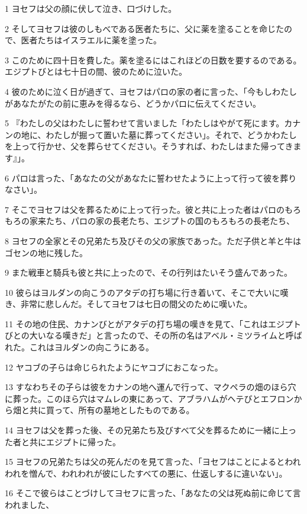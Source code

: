 \par 1 ヨセフは父の顔に伏して泣き、口づけした。
\par 2 そしてヨセフは彼のしもべである医者たちに、父に薬を塗ることを命じたので、医者たちはイスラエルに薬を塗った。
\par 3 このために四十日を費した。薬を塗るにはこれほどの日数を要するのである。エジプトびとは七十日の間、彼のために泣いた。
\par 4 彼のために泣く日が過ぎて、ヨセフはパロの家の者に言った、「今もしわたしがあなたがたの前に恵みを得るなら、どうかパロに伝えてください。
\par 5 『わたしの父はわたしに誓わせて言いました「わたしはやがて死にます。カナンの地に、わたしが掘って置いた墓に葬ってください」。それで、どうかわたしを上って行かせ、父を葬らせてください。そうすれば、わたしはまた帰ってきます』」。
\par 6 パロは言った、「あなたの父があなたに誓わせたように上って行って彼を葬りなさい」。
\par 7 そこでヨセフは父を葬るために上って行った。彼と共に上った者はパロのもろもろの家来たち、パロの家の長老たち、エジプトの国のもろもろの長老たち、
\par 8 ヨセフの全家とその兄弟たち及びその父の家族であった。ただ子供と羊と牛はゴセンの地に残した。
\par 9 また戦車と騎兵も彼と共に上ったので、その行列はたいそう盛んであった。
\par 10 彼らはヨルダンの向こうのアタデの打ち場に行き着いて、そこで大いに嘆き、非常に悲しんだ。そしてヨセフは七日の間父のために嘆いた。
\par 11 その地の住民、カナンびとがアタデの打ち場の嘆きを見て、「これはエジプトびとの大いなる嘆きだ」と言ったので、その所の名はアベル・ミツライムと呼ばれた。これはヨルダンの向こうにある。
\par 12 ヤコブの子らは命じられたようにヤコブにおこなった。
\par 13 すなわちその子らは彼をカナンの地へ運んで行って、マクペラの畑のほら穴に葬った。このほら穴はマムレの東にあって、アブラハムがヘテびとエフロンから畑と共に買って、所有の墓地としたものである。
\par 14 ヨセフは父を葬った後、その兄弟たち及びすべて父を葬るために一緒に上った者と共にエジプトに帰った。
\par 15 ヨセフの兄弟たちは父の死んだのを見て言った、「ヨセフはことによるとわれわれを憎んで、われわれが彼にしたすべての悪に、仕返しするに違いない」。
\par 16 そこで彼らはことづけしてヨセフに言った、「あなたの父は死ぬ前に命じて言われました、
